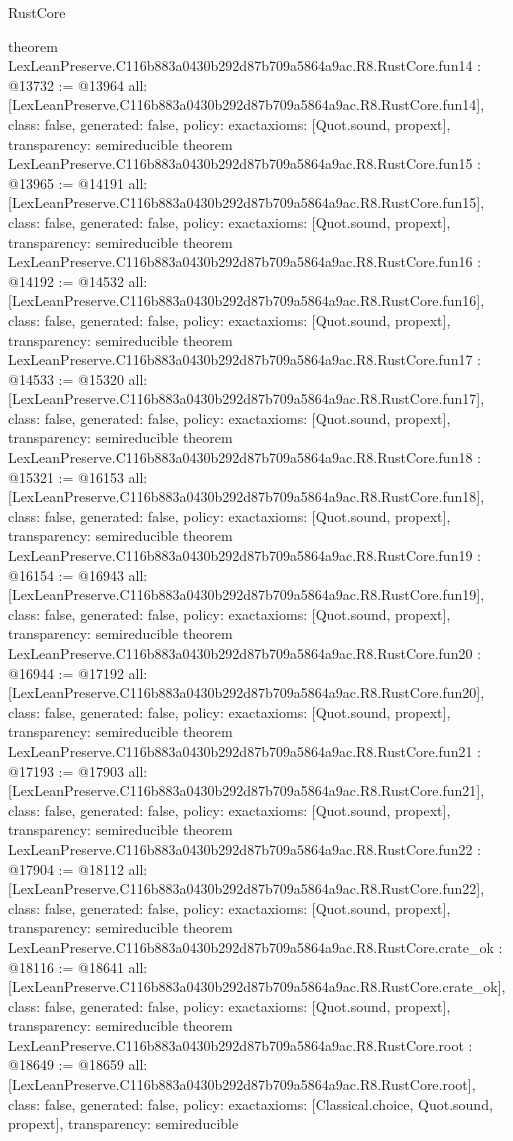 \begin{lexlean}{RustCore}
\begin{coremodule}
{}
theorem LexLeanPreserve.C116b883a0430b292d87b709a5864a9ac.R8.RustCore.fun14 : @13732 := @13964 {
  all: [LexLeanPreserve.C116b883a0430b292d87b709a5864a9ac.R8.RustCore.fun14],
  class: false,
  generated: false,
  policy: exact{axioms: [Quot.sound, propext]},
  transparency: semireducible
}
theorem LexLeanPreserve.C116b883a0430b292d87b709a5864a9ac.R8.RustCore.fun15 : @13965 := @14191 {
  all: [LexLeanPreserve.C116b883a0430b292d87b709a5864a9ac.R8.RustCore.fun15],
  class: false,
  generated: false,
  policy: exact{axioms: [Quot.sound, propext]},
  transparency: semireducible
}
theorem LexLeanPreserve.C116b883a0430b292d87b709a5864a9ac.R8.RustCore.fun16 : @14192 := @14532 {
  all: [LexLeanPreserve.C116b883a0430b292d87b709a5864a9ac.R8.RustCore.fun16],
  class: false,
  generated: false,
  policy: exact{axioms: [Quot.sound, propext]},
  transparency: semireducible
}
theorem LexLeanPreserve.C116b883a0430b292d87b709a5864a9ac.R8.RustCore.fun17 : @14533 := @15320 {
  all: [LexLeanPreserve.C116b883a0430b292d87b709a5864a9ac.R8.RustCore.fun17],
  class: false,
  generated: false,
  policy: exact{axioms: [Quot.sound, propext]},
  transparency: semireducible
}
theorem LexLeanPreserve.C116b883a0430b292d87b709a5864a9ac.R8.RustCore.fun18 : @15321 := @16153 {
  all: [LexLeanPreserve.C116b883a0430b292d87b709a5864a9ac.R8.RustCore.fun18],
  class: false,
  generated: false,
  policy: exact{axioms: [Quot.sound, propext]},
  transparency: semireducible
}
theorem LexLeanPreserve.C116b883a0430b292d87b709a5864a9ac.R8.RustCore.fun19 : @16154 := @16943 {
  all: [LexLeanPreserve.C116b883a0430b292d87b709a5864a9ac.R8.RustCore.fun19],
  class: false,
  generated: false,
  policy: exact{axioms: [Quot.sound, propext]},
  transparency: semireducible
}
theorem LexLeanPreserve.C116b883a0430b292d87b709a5864a9ac.R8.RustCore.fun20 : @16944 := @17192 {
  all: [LexLeanPreserve.C116b883a0430b292d87b709a5864a9ac.R8.RustCore.fun20],
  class: false,
  generated: false,
  policy: exact{axioms: [Quot.sound, propext]},
  transparency: semireducible
}
theorem LexLeanPreserve.C116b883a0430b292d87b709a5864a9ac.R8.RustCore.fun21 : @17193 := @17903 {
  all: [LexLeanPreserve.C116b883a0430b292d87b709a5864a9ac.R8.RustCore.fun21],
  class: false,
  generated: false,
  policy: exact{axioms: [Quot.sound, propext]},
  transparency: semireducible
}
theorem LexLeanPreserve.C116b883a0430b292d87b709a5864a9ac.R8.RustCore.fun22 : @17904 := @18112 {
  all: [LexLeanPreserve.C116b883a0430b292d87b709a5864a9ac.R8.RustCore.fun22],
  class: false,
  generated: false,
  policy: exact{axioms: [Quot.sound, propext]},
  transparency: semireducible
}
theorem LexLeanPreserve.C116b883a0430b292d87b709a5864a9ac.R8.RustCore.crate_ok : @18116 := @18641 {
  all: [LexLeanPreserve.C116b883a0430b292d87b709a5864a9ac.R8.RustCore.crate_ok],
  class: false,
  generated: false,
  policy: exact{axioms: [Quot.sound, propext]},
  transparency: semireducible
}
theorem LexLeanPreserve.C116b883a0430b292d87b709a5864a9ac.R8.RustCore.root : @18649 := @18659 {
  all: [LexLeanPreserve.C116b883a0430b292d87b709a5864a9ac.R8.RustCore.root],
  class: false,
  generated: false,
  policy: exact{axioms: [Classical.choice, Quot.sound, propext]},
  transparency: semireducible
}


\end{coremodule}
\end{lexlean}
